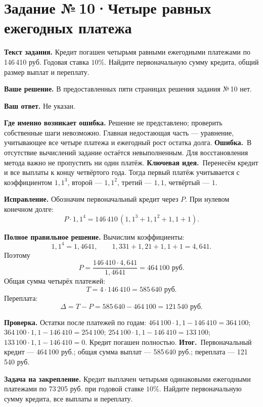 \documentclass[a4paper,11pt]{article}
\newcommand{\err}{\textcolor{red!75!black}{\textbf{Ошибка.}}\ }
\newcommand{\idea}{\textcolor{accent}{\textbf{Ключевая идея.}}\ }
\newcommand{\result}{\textcolor{accent}{\textbf{Итог.}}\ }
\newcommand{\task}[2]{\clearpage\phantomsection\label{task:#1}\section*{Задание №\,#1\;·\;#2}}
\newcommand{\labelp}[1]{\par\smallskip\textbf{#1.}\enspace}
\begin{document}
\task{10}{Четыре равных ежегодных платежа}
\labelp{Текст задания} Кредит погашен четырьмя равными ежегодными платежами по 146\,410 руб. Годовая ставка $10\%$. Найдите первоначальную сумму кредита, общий размер выплат и переплату.
\labelp{Ваше решение} В предоставленных пяти страницах решения задания №\,10 нет.
\labelp{Ваш ответ} Не указан.
\labelp{Где именно возникает ошибка} Решение не представлено; проверить собственные шаги невозможно. Главная недостающая часть --- уравнение, учитывающее все четыре платежа и ежегодный рост остатка долга.
\err В отсутствие вычислений задание остаётся невыполненным. Для восстановления метода важно не пропустить ни один платёж.
\idea Перенесём кредит и все выплаты к концу четвёртого года. Тогда первый платёж учитывается с коэффициентом $1{,}1^3$, второй --- $1{,}1^2$, третий --- $1{,}1$, четвёртый --- $1$.
\labelp{Исправление} Обозначим первоначальный кредит через $P$. При нулевом конечном долге:
\[P\cdot1{,}1^4=146\,410\,(1{,}1^3+1{,}1^2+1{,}1+1).\]
\labelp{Полное правильное решение} Вычислим коэффициенты:
\[1{,}1^4=1{,}4641,\qquad 1{,}331+1{,}21+1{,}1+1=4{,}641.\]
Поэтому
\[P=\frac{146\,410\cdot4{,}641}{1{,}4641}=464\,100\text{ руб.}\]
Общая сумма четырёх платежей:
\[T=4\cdot146\,410=585\,640\text{ руб.}\]
Переплата:
\[\Delta=T-P=585\,640-464\,100=121\,540\text{ руб.}\]
\labelp{Проверка} Остатки после платежей по годам: $464\,100\cdot1{,}1-146\,410=364\,100$; $364\,100\cdot1{,}1-146\,410=254\,100$; $254\,100\cdot1{,}1-146\,410=133\,100$; $133\,100\cdot1{,}1-146\,410=0$. Кредит погашен полностью.
\result Первоначальный кредит --- 464\,100 руб.; общая сумма выплат --- 585\,640 руб.; переплата --- 121\,540 руб.
\labelp{Задача на закрепление} Кредит выплачен четырьмя одинаковыми ежегодными платежами по 73\,205 руб. при годовой ставке $10\%$. Найдите первоначальную сумму кредита, все выплаты и переплату.
\end{document}

